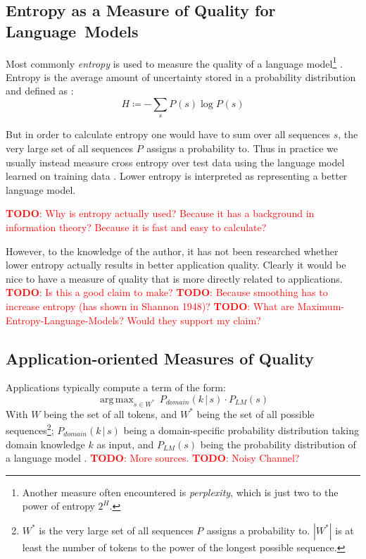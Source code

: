 \documentclass[11pt,a4paper]{article}
\newcommand\givenbase[1][]{\,#1\lvert\,}
\let\given\givenbase
\DeclareMathOperator*{\argmax}{arg\,max}
\newcommand{\cardinality}[1]{|#1|}
\newcommand{\probSymbol}[1][]{P_{#1}}
\newcommand{\prob}[2][]{\probSymbol[#1](#2)}
\newcommand{\probCond}[3][]{\prob[#1]{#2 \given #3}}
\newcommand{\todo}[1]{\textcolor{red}{\textbf{TODO}: #1}}
\begin{document}
\subsection{Entropy as a Measure of Quality for \mbox{Language Models}}

Most commonly \emph{entropy} is used to measure the quality of a language
model\footnote{Another measure often encountered is \emph{perplexity}, which is
just two to the power of entropy $2^H$.} \parencite{Goodman2001}.
Entropy is the average amount of uncertainty stored in a probability
distribution and defined as \parencite{Shannon1948}:
\begin{equation}
  H \coloneqq - \sum_{s} \prob{s} \log \prob{s}
\end{equation}

But in order to calculate entropy one would have to sum over all sequences
$s$, the very large set of all sequences $\probSymbol$ assigns a probability to.
Thus in practice we usually instead measure cross entropy over test data using
the language model learned on training data \parencite{Goodman2001}.
Lower entropy is interpreted as representing a better language model.

\todo{Why is entropy actually used? Because it has a background in information
theory? Because it is fast and easy to calculate?}

However, to the knowledge of the author, it has not been researched whether
lower entropy actually results in better application quality.
Clearly it would be nice to have a measure of quality that is more directly
related to applications.
\todo{Is this a good claim to make?}
\todo{Because smoothing has to increase entropy (has shown in Shannon 1948)?}
\todo{What are Maximum-Entropy-Language-Models? Would they support my claim?}

\subsection{Application-oriented Measures of Quality}

Applications typically compute a term of the form:
\begin{equation}\label{eq:argmaxprod}
  \argmax_{s \in W^*} \, \probCond[domain]{k}{s} \cdot \prob[LM]{s}
\end{equation}
With $W$ being the set of all tokens, and $W^*$ being the set of all possible
sequences\footnote{$W^*$ is the very large set of all sequences $\probSymbol$
assigns a probability to. $\cardinality{W^*}$ is at least the
number of tokens to the power of the longest possible sequence.};
$\probCond[domain]{k}{s}$ being a domain-specific probability distribution
taking domain knowledge $k$ as input, and $\prob[LM]{s}$ being the
probability distribution of a language model \parencite{Church1988,Brown1990}.
\todo{More sources.} \todo{Noisy Channel?}
\end{document}
